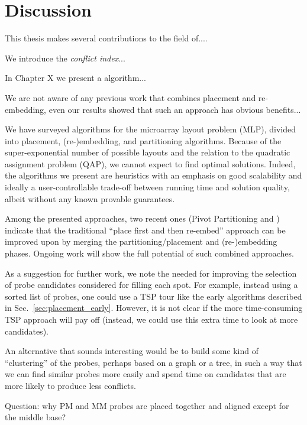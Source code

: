 \chapter{Discussion}
\label{ch:discussion}

This thesis makes several contributions to the field of....

We introduce the \emph{conflict index}...

In Chapter X we present a algorithm...

We are not aware of any previous work that combines placement and
re-embedding, even our results showed that such an approach has
obvious benefits...

We have surveyed algorithms for the microarray layout problem (MLP), divided
into placement, (re-)embedding, and partitioning algorithms.  Because of the
super-exponential number of possible layouts and the relation to the quadratic
assignment problem (QAP), we cannot expect to find optimal solutions. Indeed,
the algorithms we present are heuristics with an emphasis on good scalability
and ideally a user-controllable trade-off between running time and solution
quality, albeit without any known provable guarantees.

Among the presented approaches, two recent ones (Pivot Partitioning and
\Greedyplus) indicate that the traditional ``place first and then re-embed''
approach can be improved upon by merging the partitioning/placement and
(re-)embedding phases. Ongoing work will show the full potential of such
combined approaches.

As a suggestion for further work, we note the needed for improving
the selection of probe candidates considered for filling each spot. For
example, instead using a sorted list of probes, one could use a TSP tour
like the early algorithms described in Sec.~\ref{sec:placement_early}. However,
it is not clear if the more time-consuming TSP approach will pay off
(instead, we could use this extra time to look at more candidates).

An alternative that sounds interesting would be to build some kind of
``clustering'' of the probes, perhaps based on a graph or a tree, in such a
way that we can find similar probes more easily and spend time on candidates
that are more likely to produce less conflicts.

Question: why PM and MM probes are placed together and aligned except for the
middle base?